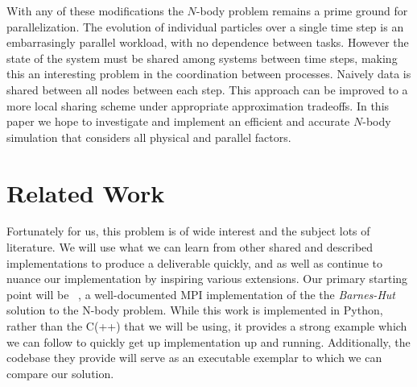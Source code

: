 \documentclass[11pt]{article}
\begin{document}
With any of these modifications the $N$-body problem remains a prime ground for parallelization. The evolution of individual particles over a single time step is an embarrasingly parallel workload, with no dependence between tasks. However the state of the system must be shared among systems between time steps, making this an interesting problem in the coordination between processes. Naively data is shared between all nodes between each step. This approach can be improved to a more local sharing scheme under appropriate approximation tradeoffs. In this paper we hope to investigate and implement an efficient and accurate $N$-body simulation that considers all physical and parallel factors.


\section {Related Work}\label{rel}
Fortunately for us, this problem is of wide interest and the subject lots of literature.
We will use what we can learn from other shared and described implementations
to produce a deliverable quickly, and as well as continue to nuance our 
implementation by inspiring various extensions.
Our primary starting point will be ~\cite{poortillo:mpiBarnesHut}, a well-documented
MPI implementation of the the \emph{Barnes-Hut} solution to the N-body problem.
While this work is implemented in Python, rather than the C(++) that we will
be using, it provides a strong example which we can follow to quickly
get up implementation up and running. Additionally, the codebase they
provide will serve as an executable exemplar to which we can compare our solution.
\end{document}
